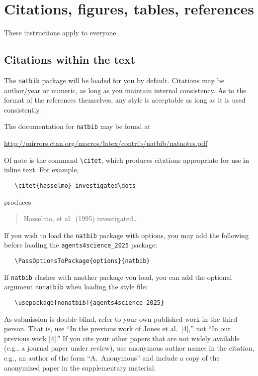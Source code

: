 \documentclass{article}
\begin{document}
\section{Citations, figures, tables, references}
\label{others}


These instructions apply to everyone.


\subsection{Citations within the text}


The \verb+natbib+ package will be loaded for you by default.  Citations may be
author/year or numeric, as long as you maintain internal consistency.  As to the
format of the references themselves, any style is acceptable as long as it is
used consistently.


The documentation for \verb+natbib+ may be found at
\begin{center}
  \url{http://mirrors.ctan.org/macros/latex/contrib/natbib/natnotes.pdf}
\end{center}
Of note is the command \verb+\citet+, which produces citations appropriate for
use in inline text.  For example,
\begin{verbatim}
   \citet{hasselmo} investigated\dots
\end{verbatim}
produces
\begin{quote}
  Hasselmo, et al.\ (1995) investigated\dots
\end{quote}


If you wish to load the \verb+natbib+ package with options, you may add the
following before loading the \verb+agents4science_2025+ package:
\begin{verbatim}
   \PassOptionsToPackage{options}{natbib}
\end{verbatim}


If \verb+natbib+ clashes with another package you load, you can add the optional
argument \verb+nonatbib+ when loading the style file:
\begin{verbatim}
   \usepackage[nonatbib]{agents4science_2025}
\end{verbatim}


As submission is double blind, refer to your own published work in the third
person. That is, use ``In the previous work of Jones et al.\ [4],'' not ``In our
previous work [4].'' If you cite your other papers that are not widely available
(e.g., a journal paper under review), use anonymous author names in the
citation, e.g., an author of the form ``A.\ Anonymous'' and include a copy of the anonymized paper in the supplementary material.
\end{document}
